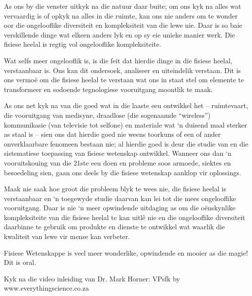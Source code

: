 { \normalsize
As ons by die venster uitkyk na die natuur daar buite; om ons kyk na alles wat vervaardig is of opkyk na alles in die ruimte, kan ons nie anders om te wonder oor die ongelooflike diversiteit en kompleksiteit van die lewe nie. Daar is so baie verskillende dinge wat elkeen anders lyk en op sy eie unieke manier werk. Die fisiese heelal is regtig vol ongelooflike kompleksiteite.\par

Wat selfs meer ongelooflik is, is die feit dat hierdie dinge in die fisiese heelal, verstaanbaar is. Ons kan dit ondersoek, analiseer en uiteindelik verstaan. Dit is ons vermoë om die fisiese heelal te verstaan wat ons in staat stel om elemente te transformeer en sodoende tegnologiese vooruitgang moontlik te maak.\par

As ons net kyk na van die goed wat in die laaste eeu ontwikkel het – ruimtevaart, die vooruitgang van medisyne, draadlose (die sogenaamde “wireless”) kommunikasie (van televisie tot selfone) en materiale wat ‘n duisend maal sterker as staal is – sien ons dat hierdie goed nie weens toorkuns of een of ander onverklaarbare fenomeen bestaan nie; al hierdie goed is deur die studie van en die sistematiese toepassing van fisiese wetenskap ontwikkel. Wanneer ons dan ‘n vooruitskouing van die 21ste eeu doen en probleme soos armoede, siektes en besoedeling sien, gaan ons deels by die fisiese wetenskap aanklop vir oplossings. \par

Maak nie saak hoe groot die probleem blyk te wees nie, die fisiese heelal is verstaanbaar en ‘n toegewyde studie daarvan kan lei tot die mees ongelooflike vooruitgang. Daar is nie ‘n meer opwindende uitdaging as om die oënskynlike kompleksiteite van die fisiese heelal te kan uitlê nie en die ongelooflike diversiteit daarbinne te gebruik om produkte en dienste te ontwikkel wat waarlik die kwaliteit van lewe vir mense kan verbeter.\par

Fisiese Wetenskappe is veel meer wonderlike, opwindende en mooier as die magie! Dit is oral.

Kyk na die video inleiding van Dr. Mark Horner:  VPsfk  by www.everythingscience.co.za

}





